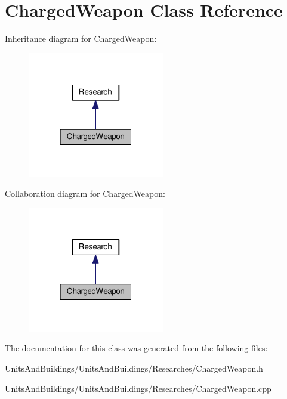 \hypertarget{class_charged_weapon}{}\section{Charged\+Weapon Class Reference}
\label{class_charged_weapon}


Inheritance diagram for Charged\+Weapon\+:
\nopagebreak
\begin{figure}[H]
\begin{center}
\leavevmode
\includegraphics[width=169pt]{class_charged_weapon__inherit__graph}
\end{center}
\end{figure}


Collaboration diagram for Charged\+Weapon\+:
\nopagebreak
\begin{figure}[H]
\begin{center}
\leavevmode
\includegraphics[width=169pt]{class_charged_weapon__coll__graph}
\end{center}
\end{figure}


The documentation for this class was generated from the following files\+:\begin{DoxyCompactItemize}
\item 
Units\+And\+Buildings/\+Units\+And\+Buildings/\+Researches/Charged\+Weapon.\+h\item 
Units\+And\+Buildings/\+Units\+And\+Buildings/\+Researches/Charged\+Weapon.\+cpp\end{DoxyCompactItemize}
